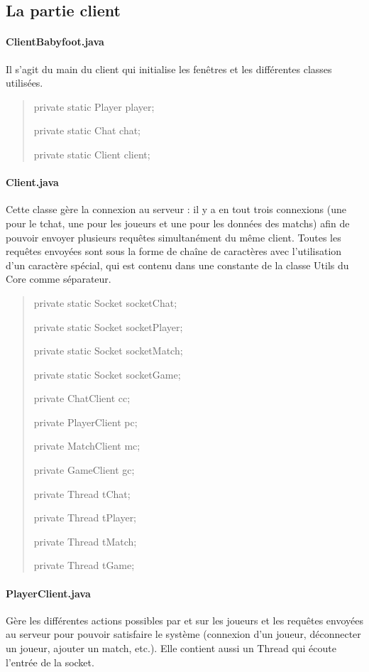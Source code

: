 \documentclass[a4paper,12pt]{report}
\begin{document}
\subsection{La partie client}
\paragraph{ClientBabyfoot.java}
Il s'agit du main du client qui initialise les fenêtres et les différentes classes utilisées.
\begin{quote}
	private static Player player;
    
	private static Chat chat;
    
	private static Client client;
\end{quote}
\paragraph{Client.java}
Cette classe gère la connexion au serveur : il y a en tout trois connexions (une pour le tchat, une pour les joueurs et une pour les données des matchs) afin de pouvoir envoyer plusieurs requêtes simultanément du même client. Toutes les requêtes envoyées sont sous la forme de chaîne de caractères avec l'utilisation d'un caractère spécial, qui est contenu dans une constante de la classe Utils du Core comme séparateur.
\begin{quote}
	private static Socket socketChat;
	
	private static Socket socketPlayer;
	
	private static Socket socketMatch;
	
	private static Socket socketGame;
	
	private ChatClient cc;
	
	private PlayerClient pc;
	
	private MatchClient mc;
	
	private GameClient gc;
	
	private Thread tChat;
	
	private Thread tPlayer;
	
	private Thread tMatch;
	
	private Thread tGame;
\end{quote}
\paragraph{PlayerClient.java}
Gère les différentes actions possibles par et sur les joueurs et les requêtes envoyées au serveur pour pouvoir satisfaire le système (connexion d'un joueur, déconnecter un joueur, ajouter un match, etc.). Elle contient aussi un Thread qui écoute l'entrée de la socket.
\end{document}
